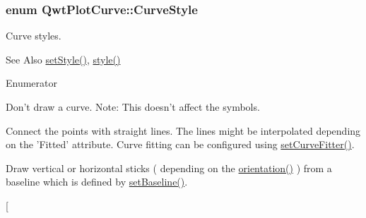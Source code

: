 \hypertarget{class_qwt_plot_curve_a15998aa80a11ba6ba80eebabaf773f70}{
\subsubsection[{Curve\-Style}]{\setlength{\rightskip}{0pt plus 5cm}enum {\bf Qwt\-Plot\-Curve\-::\-Curve\-Style}}}\label{class_qwt_plot_curve_a15998aa80a11ba6ba80eebabaf773f70}
Curve styles. \begin{DoxySeeAlso}{See Also}
\hyperlink{class_qwt_plot_curve_a2de41014c2b87fd459d0c438a15dd33e}{set\-Style()}, \hyperlink{class_qwt_plot_curve_a2df43bdea2a17118c9114d6fa774e598}{style()} 
\end{DoxySeeAlso}
\begin{Desc}
\item[Enumerator]\par
\begin{description}
\item[{\em 
\hypertarget{class_qwt_plot_curve_a15998aa80a11ba6ba80eebabaf773f70a0b6dcf16619a08af39437d6b6a234c9c}{No\-Curve}\label{class_qwt_plot_curve_a15998aa80a11ba6ba80eebabaf773f70a0b6dcf16619a08af39437d6b6a234c9c}
}]Don't draw a curve. Note\-: This doesn't affect the symbols. \item[{\em 
\hypertarget{class_qwt_plot_curve_a15998aa80a11ba6ba80eebabaf773f70a8914d88bcd5f680e7091469fed67c9ba}{Lines}\label{class_qwt_plot_curve_a15998aa80a11ba6ba80eebabaf773f70a8914d88bcd5f680e7091469fed67c9ba}
}]Connect the points with straight lines. The lines might be interpolated depending on the 'Fitted' attribute. Curve fitting can be configured using \hyperlink{class_qwt_plot_curve_ac15588c78d175906a30de501b4dd7957}{set\-Curve\-Fitter()}. \item[{\em 
\hypertarget{class_qwt_plot_curve_a15998aa80a11ba6ba80eebabaf773f70a770b0908599507e5677b6e9ff9913f38}{Sticks}\label{class_qwt_plot_curve_a15998aa80a11ba6ba80eebabaf773f70a770b0908599507e5677b6e9ff9913f38}
}]Draw vertical or horizontal sticks ( depending on the \hyperlink{class_qwt_plot_abstract_series_item_aa51dc15e0845c1674602828a90d75f81}{orientation()} ) from a baseline which is defined by \hyperlink{class_qwt_plot_curve_a2d60cc9c35527480ad3a7b2f668d05fc}{set\-Baseline()}. \item[{\em 
}
\end{description}
\end{Desc}
